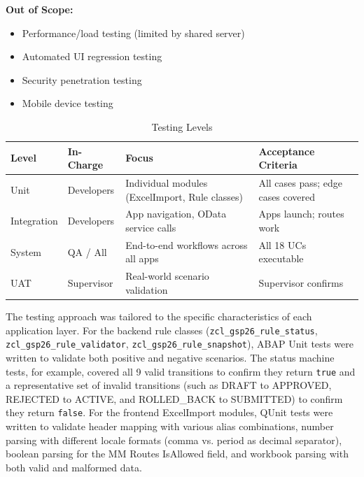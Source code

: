 \documentclass[12pt,a4paper]{report}
\begin{document}
\textbf{Out of Scope:}
\begin{itemize}[leftmargin=2em]
  \item Performance/load testing (limited by shared server)
  \item Automated UI regression testing
  \item Security penetration testing
  \item Mobile device testing
\end{itemize}

\begin{table}[H]
\centering\small
\begin{tabularx}{\textwidth}{|l|l|X|X|}
  \hline
  \rowcolor{tableheadpeach}
  \textbf{Level} & \textbf{In-Charge} & \textbf{Focus} & \textbf{Acceptance Criteria} \\ \hline
  Unit        & Developers     & Individual modules (ExcelImport, Rule classes) & All cases pass; edge cases covered \\ \hline
  Integration & Developers     & App navigation, OData service calls             & Apps launch; routes work \\ \hline
  System      & QA / All       & End-to-end workflows across all apps            & All 18 UCs executable \\ \hline
  UAT         & Supervisor     & Real-world scenario validation                  & Supervisor confirms \\ \hline
\end{tabularx}
\caption{Testing Levels}
\label{tab:testing-levels}
\end{table}


The testing approach was tailored to the specific characteristics of each application layer. For the backend rule classes (\texttt{zcl\_gsp26\_rule\_status}, \texttt{zcl\_gsp26\_rule\_validator}, \texttt{zcl\_gsp26\_rule\_snapshot}), ABAP Unit tests were written to validate both positive and negative scenarios. The status machine tests, for example, covered all 9 valid transitions to confirm they return \texttt{true} and a representative set of invalid transitions (such as DRAFT to APPROVED, REJECTED to ACTIVE, and ROLLED\_BACK to SUBMITTED) to confirm they return \texttt{false}. For the frontend ExcelImport modules, QUnit tests were written to validate header mapping with various alias combinations, number parsing with different locale formats (comma vs. period as decimal separator), boolean parsing for the MM Routes IsAllowed field, and workbook parsing with both valid and malformed data.
\end{document}
